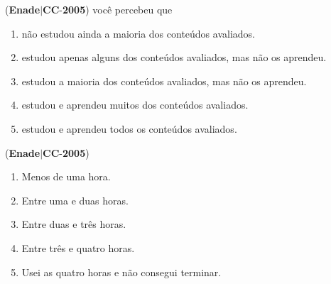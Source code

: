 \documentclass{exam}
\begin{document}
\begin{questions}
\begin{enumerate}[label=\alph*)]
	\end{enumerate}

\question (\textbf{Enade}$|$\textbf{CC}-\textbf{2005}) você percebeu que
	\begin{enumerate}[label=\alph*)]
		\item  não estudou ainda a maioria dos conteúdos avaliados.
		\item  estudou apenas alguns dos conteúdos avaliados, mas não
os aprendeu.
		\item  estudou a maioria dos conteúdos avaliados, mas não os
aprendeu.
		\item  estudou e aprendeu muitos dos conteúdos avaliados.
		\item  estudou e aprendeu todos os conteúdos avaliados.

	\end{enumerate}

\question (\textbf{Enade}$|$\textbf{CC}-\textbf{2005}) 	\begin{enumerate}[label=\alph*)]
		\item  Menos de uma hora.
		\item  Entre uma e duas horas.
		\item  Entre duas e três horas.
		\item  Entre três e quatro horas.
		\item  Usei as quatro horas e não consegui terminar.
	\end{enumerate}

\end{questions}
\end{document}
